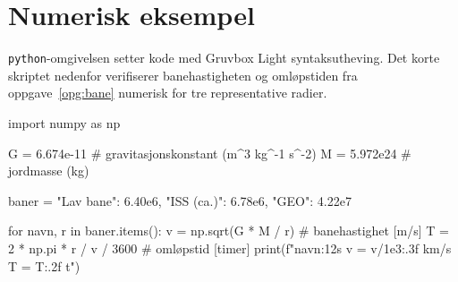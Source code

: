\documentclass[11pt]{article}
\begin{document}
\section{Numerisk eksempel}

\verb|python|-omgivelsen setter kode med Gruvbox Light
syntaksutheving. Det korte skriptet nedenfor verifiserer
banehastigheten og omløpstiden fra oppgave~\ref{opg:bane} numerisk for
tre representative radier.

\begin{python}
import numpy as np

G = 6.674e-11   # gravitasjonskonstant  (m^3 kg^-1 s^-2)
M = 5.972e24    # jordmasse             (kg)

baner = {"Lav bane":   6.40e6,
         "ISS (ca.)":  6.78e6,
         "GEO":        4.22e7}

for navn, r in baner.items():
    v = np.sqrt(G * M / r)           # banehastighet  [m/s]
    T = 2 * np.pi * r / v / 3600    # omløpstid      [timer]
    print(f"{navn:12s}  v = {v/1e3:.3f} km/s   T = {T:.2f} t")
\end{python}
\end{document}
